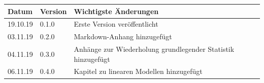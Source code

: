 \documentclass[]{book}
\begin{document}
\begin{longtable}[]{@{}lll@{}}
\toprule
\begin{minipage}[b]{0.13\columnwidth}\raggedright\strut
Datum\strut
\end{minipage} & \begin{minipage}[b]{0.13\columnwidth}\raggedright\strut
Version\strut
\end{minipage} & \begin{minipage}[b]{0.41\columnwidth}\raggedright\strut
Wichtigste Änderungen\strut
\end{minipage}\tabularnewline
\midrule
\endhead
\begin{minipage}[t]{0.13\columnwidth}\raggedright\strut
19.10.19\strut
\end{minipage} & \begin{minipage}[t]{0.13\columnwidth}\raggedright\strut
0.1.0\strut
\end{minipage} & \begin{minipage}[t]{0.41\columnwidth}\raggedright\strut
Erste Version veröffentlicht\strut
\end{minipage}\tabularnewline
\begin{minipage}[t]{0.13\columnwidth}\raggedright\strut
03.11.19\strut
\end{minipage} & \begin{minipage}[t]{0.13\columnwidth}\raggedright\strut
0.2.0\strut
\end{minipage} & \begin{minipage}[t]{0.41\columnwidth}\raggedright\strut
Markdown-Anhang hinzugefügt\strut
\end{minipage}\tabularnewline
\begin{minipage}[t]{0.13\columnwidth}\raggedright\strut
04.11.19\strut
\end{minipage} & \begin{minipage}[t]{0.13\columnwidth}\raggedright\strut
0.3.0\strut
\end{minipage} & \begin{minipage}[t]{0.41\columnwidth}\raggedright\strut
Anhänge zur Wiederholung grundlegender Statistik hinzugefügt\strut
\end{minipage}\tabularnewline
\begin{minipage}[t]{0.13\columnwidth}\raggedright\strut
06.11.19\strut
\end{minipage} & \begin{minipage}[t]{0.13\columnwidth}\raggedright\strut
0.4.0\strut
\end{minipage} & \begin{minipage}[t]{0.41\columnwidth}\raggedright\strut
Kapitel zu linearen Modellen hinzugefügt\strut
\end{minipage}\tabularnewline
\bottomrule
\end{longtable}
\end{document}
